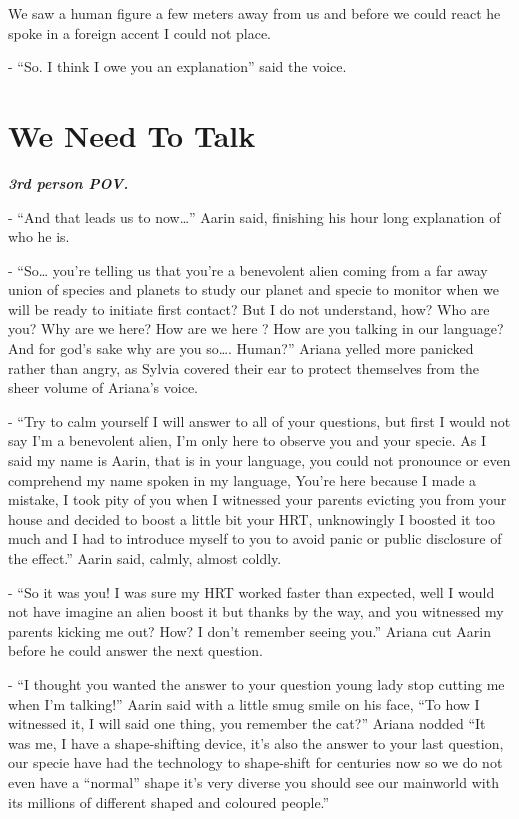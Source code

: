 \documentclass[hidelinks,12pt,a4paper]{book}
\begin{document}
We saw a human figure a few meters away from us and before we could react he spoke in a foreign accent I could not place.\par
\bigskip

- “So. I think I owe you an explanation” said the voice.
\chapter{We Need To Talk}
\textit{\textbf{3rd person POV.}}

- “And that leads us to now…” Aarin said, finishing his hour long explanation of who he is.\par
\bigskip

- “So… you're telling us that you're a benevolent alien coming from a far 
away union of species and planets to study our planet and specie to monitor when we will be 
ready to initiate first contact? But I do not understand, how? Who are you? Why are we here? 
How are we here ? How are you talking in our language? And for god's sake why are you so…. Human?” 
Ariana yelled more panicked rather than angry, as Sylvia covered their ear to protect themselves 
from the sheer volume of Ariana's voice.\par
\bigskip

- “Try to calm yourself I will answer to all of your questions, 
but first I would not say I'm a benevolent alien, I'm only here to 
observe you and your specie. As I said my name is Aarin, that is in your language, 
you could not pronounce or even comprehend my name spoken in my language, You're here because I made a mistake,
 I took pity of you when I witnessed your parents evicting you from your 
 house and decided to boost a little bit your HRT, unknowingly I boosted it too much and I had to 
 introduce myself to you to avoid panic or public disclosure of the effect.” Aarin said, calmly, almost coldly.\par
 \bigskip

- “So it was you! I was sure my HRT worked faster than expected, well I would not have imagine an alien boost it 
but thanks by the way, and you witnessed my parents kicking me out? How? I don't remember seeing you.”
 Ariana cut Aarin before he could answer the next question.\par
 \bigskip

- “I thought you wanted the answer to your question young lady stop cutting me when I'm talking!” 
Aarin said with a little smug smile on his face, “To how I witnessed it, I will said one thing, you remember the cat?” 
Ariana nodded “It was me, I have a shape-shifting device, it's also the answer to your last question, 
our specie have had the technology to shape-shift for centuries now so we do not even have a “normal” shape it's 
very diverse you should see our mainworld with its millions of different shaped and coloured people.”\par
\bigskip
\end{document}
